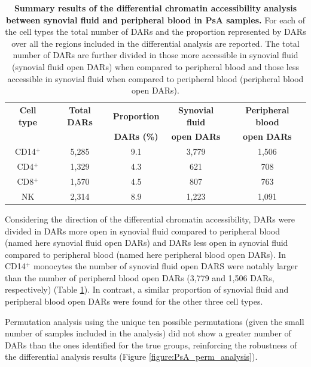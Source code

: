 \begin{table}[htbp]
\centering
\begin{tabular}{@{}c c c c c}
\toprule
\textbf{Cell type}  & \textbf{Total DARs} &  \textbf{Proportion}  & \textbf{Synovial fluid } & \textbf{Peripheral blood} \\
                    &                     &  \textbf{DARs (\%)}  & \textbf{open DARs} & \textbf{open DARs} \\
\midrule
\midrule
CD14$^+$ & 5,285 & 9.1 & 3,779 & 1,506 \\
CD4$^+$  & 1,329 & 4.3 & 621 & 708 \\
CD8$^+$  & 1,570 & 4.5 & 807 & 763 \\
NK       & 2,314 & 8.9 & 1,223 & 1,091 \\
\bottomrule
\end{tabular}
\medskip %
\caption[Summary results of the differential chromatin accessibility analysis between synovial fluid and peripheral blood in PsA samples.]{\textbf{Summary results of the differential chromatin accessibility analysis between synovial fluid and peripheral blood in PsA samples.} For each of the cell types the total number of DARs and the proportion represented by DARs over all the regions included in the differential analysis are reported. The total number of DARs are further divided in those more accessible in synovial fluid (synovial fluid open DARs) when compared to peripheral blood and those less accessible in synovial fluid when compared to peripheral blood (peripheral blood open DARs).}
\label{tab:PSA_DOCs_results}
\end{table}

Considering the direction of the differential chromatin accessibility, DARs were divided in DARs more open in synovial fluid compared to peripheral blood (named here synovial fluid open DARs) and DARs less open in synovial fluid compared to peripheral blood (named here peripheral blood open DARs). In CD14$^+$ monocytes the number of synovial fluid open DARS were notably larger than the number of peripheral blood open DARs (3,779 and 1,506 DARs, respectively) (Table \ref{tab:PSA_DOCs_results}). In contrast, a similar proportion of synovial fluid and peripheral blood open DARs were found for the other three cell types.

Permutation analysis using the unique ten possible permutations (given the small number of samples included in the analysis) did not show a greater number of DARs than the ones identified for the true groups, reinforcing the robustness of the differential analysis results (Figure \ref{figure:PsA_perm_analysis}).


